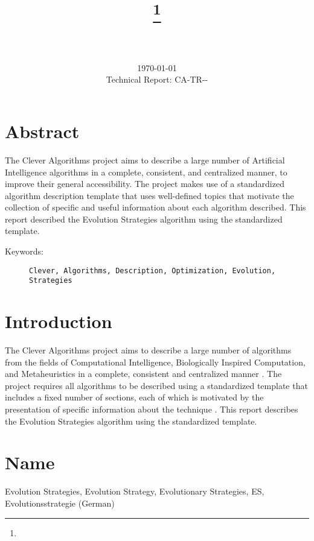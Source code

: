 \documentclass[a4paper, 11pt]{article}
\title{{\myreporttitle}\footnote{\myreportlicense}}
\author{\myreportauthor\\{\myreportemail}\\\small\myreportproject}
\date{\today\\{\small{Technical Report: CA-TR-{\myreportdate}-\myreportversion}}}
\begin{document}
\maketitle

\section*{Abstract} 
The Clever Algorithms project aims to describe a large number of Artificial Intelligence algorithms in a complete, consistent, and centralized manner, to improve their general accessibility. 
The project makes use of a standardized algorithm description template that uses well-defined topics that motivate the collection of specific and useful information about each algorithm described.
This report described the Evolution Strategies algorithm using the standardized template.

\begin{description}
	\item[Keywords:] {\small\texttt{Clever, Algorithms, Description, Optimization, Evolution, Strategies}}
\end{description} 

\section{Introduction} 
\label{sec:intro}
The Clever Algorithms project aims to describe a large number of algorithms from the fields of Computational Intelligence, Biologically Inspired Computation, and Metaheuristics in a complete, consistent and centralized manner \cite{Brownlee2010}.
The project requires all algorithms to be described using a standardized template that includes a fixed number of sections, each of which is motivated by the presentation of specific information about the technique \cite{Brownlee2010a}.
This report describes the Evolution Strategies algorithm using the standardized template.

\section{Name} 
\label{sec:name}
Evolution Strategies, Evolution Strategy, Evolutionary Strategies, ES, Evolutionsstrategie (German)
\end{document}
